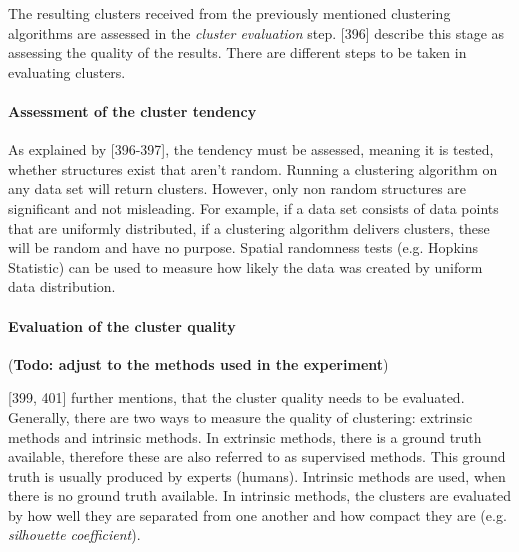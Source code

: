 The resulting clusters received from the previously mentioned clustering algorithms are assessed in the \textit{cluster evaluation} step. \textcite{han2011data}[396] describe this stage as assessing the quality of the results.
There are different steps to be taken in evaluating clusters. 
 
  \paragraph{Assessment of the cluster tendency}
  As explained by \textcite{han2011data}[396-397], the tendency must be assessed, meaning it is tested, whether structures exist that aren't random. Running a clustering algorithm on any data set will return clusters. However, only non random structures are significant and not misleading. For example, if a data set consists of data points that are uniformly distributed, if a clustering algorithm delivers clusters, these will be random and have no purpose. Spatial randomness tests (e.g. Hopkins Statistic) can be used to measure how likely the data was created by uniform data distribution.

 

  \paragraph{Evaluation of the cluster quality}
  (\textbf{Todo: adjust to the methods used in the experiment})

  \textcite{han2011data}[399, 401] further mentions, that the cluster quality needs to be evaluated. Generally, there are two ways to measure the quality of clustering: extrinsic methods and intrinsic methods. In extrinsic methods, there is a ground truth available, therefore these are also referred to as supervised methods. This ground truth is usually produced by experts (humans). Intrinsic methods are used, when there is no ground truth available. In intrinsic methods, the clusters are evaluated by how well they are separated from one another and how compact they are (e.g. \textit{silhouette coefficient}).

